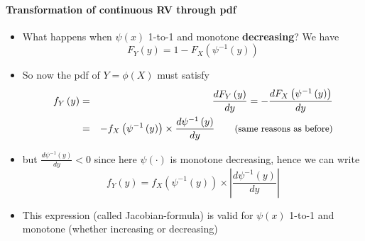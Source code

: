 \documentclass[notes=show,smaller,handout]{beamer}\usepackage[]{graphicx}\usepackage[]{color}
\newenvironment{stepitemize}{\begin{itemize}[<+->]}{\end{itemize} }
\begin{document}
\begin{frame}{\secname}
  \framesubtitle{Transformation of continuous RV through pdf}

  \begin{stepitemize}
  \item What happens when $\psi \left( x\right) $ 1-to-1 and monotone \textbf{%
  decreasing}? We have%
  \begin{equation*}
  F_{Y}\left( y\right) =1-F_{X}\left( \psi ^{-1}\left( y\right) \right)
  \end{equation*}

  \item So now the pdf of $Y=\phi \left( X\right) $ must satisfy
  \begin{eqnarray*}
  f_{Y}\left( y\right) &=&\frac{dF_{Y}\left( y\right) }{dy}=-\frac{%
  dF_{X}\left( \psi ^{-1}\left( y\right) \right) }{dy} \\
  &=&-f_{X}\left( \psi ^{-1}\left( y\right) \right) \times \frac{d\psi
  ^{-1}\left( y\right) }{dy}\qquad \text{{\small (same reasons as before)}}
  \end{eqnarray*}

  \item but $\frac{d\psi ^{-1}\left( y\right) }{dy}<0$ since here $\psi \left(
  \cdot \right) $ is monotone decreasing, hence we can write%
  \begin{equation*}
  f_{Y}\left( y\right) =f_{X}\left( \psi ^{-1}\left( y\right) \right) \times
  \left\vert \frac{d\psi ^{-1}\left( y\right) }{dy}\right\vert
  \end{equation*}

  \item This expression (called Jacobian-formula) is valid for $\psi \left( x\right) $ 1-to-1 and
  monotone (whether increasing or decreasing)
  \end{stepitemize}
\end{frame}
\end{document}
